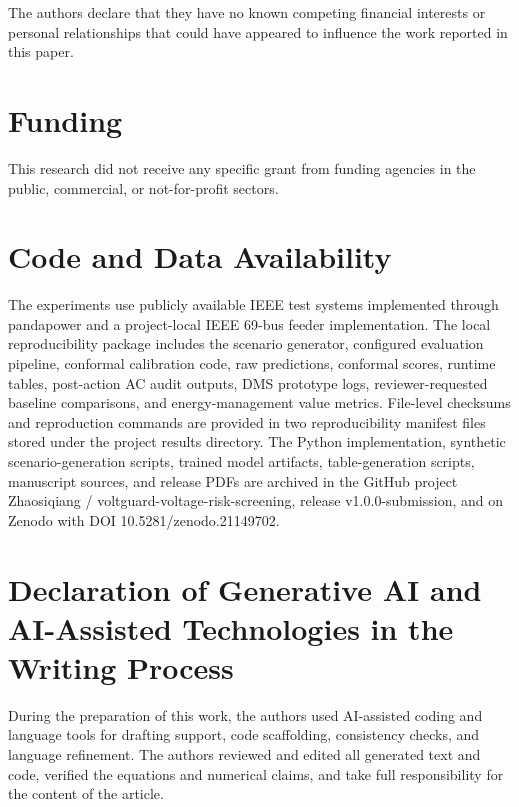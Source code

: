 \documentclass[
  preprint,12pt]{elsarticle}
\begin{document}
The authors declare that they have no known competing financial
interests or personal relationships that could have appeared to
influence the work reported in this paper.

\section*{Funding}\label{funding}

This research did not receive any specific grant from funding agencies
in the public, commercial, or not-for-profit sectors.

\section*{Code and Data Availability}\label{code-and-data-availability}

The experiments use publicly available IEEE test systems implemented
through pandapower and a project-local IEEE 69-bus feeder
implementation. The local reproducibility package includes the scenario
generator, configured evaluation pipeline, conformal calibration code,
raw predictions, conformal scores, runtime tables, post-action AC audit
outputs, DMS prototype logs, reviewer-requested baseline comparisons,
and energy-management value metrics. File-level checksums and
reproduction commands are provided in two reproducibility manifest files
stored under the project results directory. The Python implementation,
synthetic scenario-generation scripts, trained model artifacts,
table-generation scripts, manuscript sources, and release PDFs are
archived in the GitHub project Zhaosiqiang /
voltguard-voltage-risk-screening, release v1.0.0-submission, and on
Zenodo with DOI 10.5281/zenodo.21149702.

\section*{Declaration of Generative AI and AI-Assisted Technologies in
the Writing
Process}\label{declaration-of-generative-ai-and-ai-assisted-technologies-in-the-writing-process}

During the preparation of this work, the authors used AI-assisted coding
and language tools for drafting support, code scaffolding, consistency
checks, and language refinement. The authors reviewed and edited all
generated text and code, verified the equations and numerical claims,
and take full responsibility for the content of the article.
\end{document}
